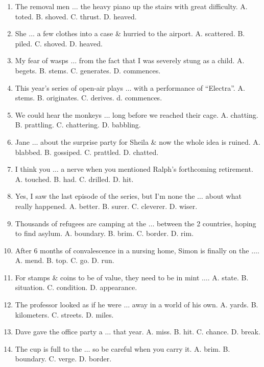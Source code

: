 \documentclass{article}
\numberwithin{equation}{section}
\begin{document}
\begin{enumerate}[leftmargin=8mm]
	\item The removal men $\ldots$ the heavy piano up the stairs with great difficulty. {\sf A.} toted. {\sf B.} shoved. {\sf C.} thrust. {\sf D.} heaved.
	\item She $\ldots$ a few clothes into a case \& hurried to the airport. {\sf A.} scattered. {\sf B.} piled. {\sf C.} shoved. {\sf D.} heaved.
	\item My fear of wasps $\ldots$ from the fact that I was severely stung as a child. {\sf A.} begets. {\sf B.} stems. {\sf C.} generates. {\sf D.} commences.
	\item This year's series of open-air plays $\ldots$ with a performance of ``Electra''. {\sf A.} stems. {\sf B.} originates. {\sf C.} derives. d. commences.
	\item We could hear the monkeys $\ldots$ long before we reached their cage. {\sf A.} chatting. {\sf B.} prattling. {\sf C.} chattering. {\sf D.} babbling.
	\item Jane $\ldots$ about the surprise party for Sheila \& now the whole idea is ruined. {\sf A.} blabbed. {\sf B.} gossiped. {\sf C.} prattled. {\sf D.} chatted.
	\item I think you $\ldots$ a nerve when you mentioned Ralph's forthcoming retirement. {\sf A.} touched. {\sf B.} had. {\sf C.} drilled. {\sf D.} hit.
	\item Yes, I saw the last episode of the series, but I'm none the $\ldots$ about what really happened. {\sf A.} better. {\sf B.} surer. {\sf C.} cleverer. {\sf D.} wiser.
	\item Thousands of refugees are camping at the $\ldots$ between the 2 countries, hoping to find asylum. {\sf A.} boundary. {\sf B.} brim. {\sf C.} border. {\sf D.} rim.
	\item After 6 months of convalescence in a nursing home, Simon is finally on the $\ldots$. {\sf A.} mend. {\sf B.} top. {\sf C.} go. {\sf D.} run.
	\item For stamps \& coins to be of value, they need to be in mint $\ldots$. {\sf A.} state. {\sf B.} situation. {\sf C.} condition. {\sf D.} appearance.
	\item The professor looked as if he were $\ldots$ away in a world of his own. {\sf A.} yards. {\sf B.} kilometers. {\sf C.} streets. {\sf D.} miles.
	\item Dave gave the office party a $\ldots$ that year. {\sf A.} miss. {\sf B.} hit. {\sf C.} chance. {\sf D.} break.
	\item The cup is full to the $\ldots$ so be careful when you carry it. {\sf A.} brim. {\sf B.} boundary. {\sf C.} verge. {\sf D.} border.

\end{enumerate}
\end{document}

